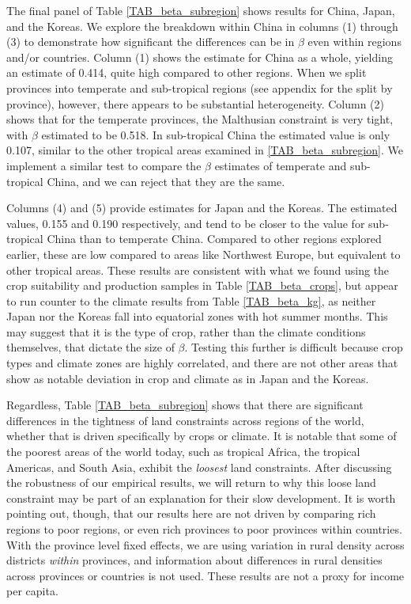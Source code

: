 \documentclass[11pt]{article}
\begin{document}
The final panel of Table \ref{TAB_beta_subregion} shows results for China, Japan, and the Koreas. We explore the breakdown within China in columns (1) through (3) to demonstrate how significant the differences can be in $\beta$ even within regions and/or countries. Column (1) shows the estimate for China as a whole, yielding an estimate of 0.414, quite high compared to other regions. When we split provinces into temperate and sub-tropical regions (see appendix for the split by province), however, there appears to be substantial heterogeneity. Column (2) shows that for the temperate provinces, the Malthusian constraint is very tight, with $\beta$ estimated to be 0.518. In sub-tropical China the estimated value is only 0.107, similar to the other tropical areas examined in \ref{TAB_beta_subregion}. We implement a similar test to compare the $\beta$ estimates of temperate and sub-tropical China, and we can reject that they are the same.

Columns (4) and (5) provide estimates for Japan and the Koreas. The estimated values, 0.155 and 0.190 respectively, and tend to be closer to the value for sub-tropical China than to temperate China. Compared to other regions explored earlier, these are low compared to areas like Northwest Europe, but equivalent to other tropical areas. These results are consistent with what we found using the crop suitability and production samples in Table \ref{TAB_beta_crops}, but appear to run counter to the climate results from Table \ref{TAB_beta_kg}, as neither Japan nor the Koreas fall into equatorial zones with hot summer months. This may suggest that it is the type of crop, rather than the climate conditions themselves, that dictate the size of $\beta$. Testing this further is difficult because crop types and climate zones are highly correlated, and there are not other areas that show as notable deviation in crop and climate as in Japan and the Koreas.

Regardless, Table \ref{TAB_beta_subregion} shows that there are significant differences in the tightness of land constraints across regions of the world, whether that is driven specifically by crops or climate. It is notable that some of the poorest areas of the world today, such as tropical Africa, the tropical Americas, and South Asia, exhibit the \textit{loosest} land constraints. After discussing the robustness of our empirical results, we will return to why this loose land constraint may be part of an explanation for their slow development. It is worth pointing out, though, that our results here are not driven by comparing rich regions to poor regions, or even rich provinces to poor provinces within countries. With the province level fixed effects, we are using variation in rural density across districts \textit{within} provinces, and information about differences in rural densities across provinces or countries is not used. These results are not a proxy for income per capita. 
\end{document}
